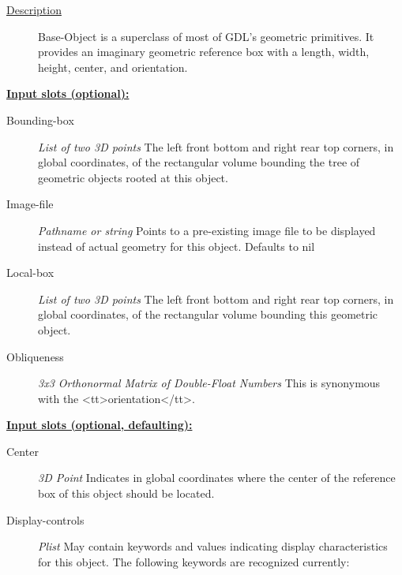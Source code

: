 \documentclass [11pt]{book}
\begin{document}
\begin{itemize}
\begin{description}
\item [
\underline{Description}]


Base-Object is a superclass of most of GDL's geometric primitives. It 
provides an imaginary geometric reference box with a length, width, height, center, 
and orientation.



\end{description}








\textbf{
\underline{Input slots (optional):}}

\begin{description}

\item [Bounding-box]
\emph{List of two 3D points} The left front bottom and right rear top corners, in global coordinates,
of the rectangular volume bounding the tree of geometric objects rooted at this object.


\item [Image-file]
\emph{Pathname or string} Points to a pre-existing image file to be displayed instead of actual geometry for this object. Defaults to nil


\item [Local-box]
\emph{List of two 3D points} The left front bottom and right rear top corners, in global coordinates,
of the rectangular volume bounding this geometric object.


\item [Obliqueness]
\emph{3x3 Orthonormal Matrix of Double-Float Numbers} This is synonymous with the <tt>orientation</tt>.


\end{description}






\textbf{
\underline{Input slots (optional, defaulting):}}

\begin{description}

\item [Center]
\emph{3D Point} Indicates in global coordinates where the center of the reference
box of this object should be located.


\item [Display-controls]
\emph{Plist} May contain keywords and values indicating display characteristics for
this object. The following keywords are recognized currently:


\end{description}
\end{itemize}
\end{document}
